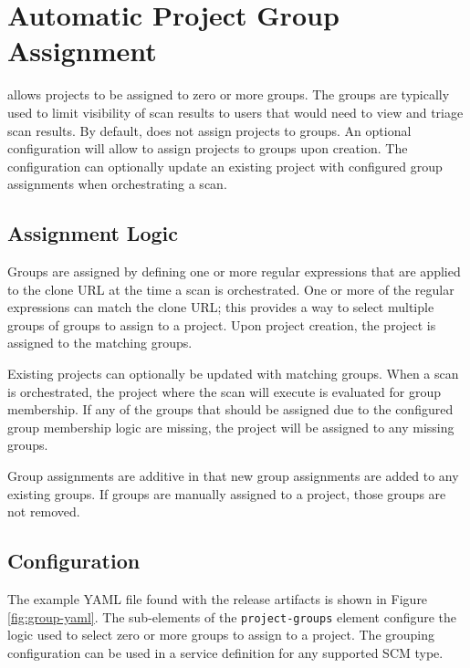 \chapter{Automatic Project Group Assignment}\label{sec:project-groups}

\cxone allows projects to be assigned to zero or more groups.  The groups are typically
used to limit visibility of scan results to users that would need to view and triage
scan results.  By default, \cxoneflow does not assign projects to groups.  An optional
configuration will allow \cxoneflow to assign projects to groups upon creation.  The
configuration can optionally update an existing project with configured group assignments
when orchestrating a scan.


\section{Assignment Logic}

Groups are assigned by defining one or more regular expressions that are applied to the clone
URL at the time a scan is orchestrated.  One or more of the regular expressions can match
the clone URL; this provides a way to select multiple groups of groups to assign to a project.
Upon project creation, the project is assigned to the matching groups.

Existing projects can optionally be updated with matching groups.  When a scan is orchestrated, the
project where the scan will execute is evaluated for group membership.  If any of the groups that
should be assigned due to the configured group membership logic are missing, the project will be
assigned to any missing groups.

Group assignments are additive in that new group assignments are added to any existing groups. If
groups are manually assigned to a project, those groups are not removed.  


\section{Configuration}

The example YAML file found with the \cxoneflow release artifacts is shown in Figure
\ref{fig:group-yaml}. The sub-elements of the \texttt{project-groups}
element configure the logic used to select zero or more groups to assign to a
\cxone project.  The grouping configuration can be used in a service definition for any
supported SCM type.

